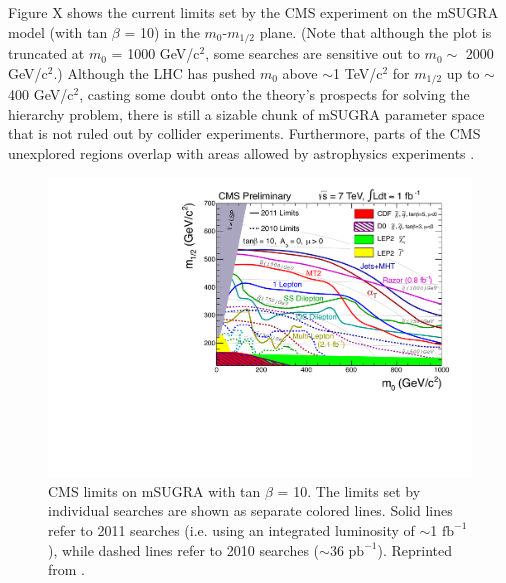 \documentclass[12pt, letterpaper]{report}
\begin{document}
Figure X shows the current limits set by the CMS experiment on the mSUGRA model (with tan $\beta$ = 10) in the $m_{0}$-$m_{1/2}$ plane.  (Note that although the plot is truncated at $m_{0}$ = 1000 GeV/$\mbox{c}^{2}$, some searches are sensitive out to $m_{0} \sim$ 2000 GeV/$\mbox{c}^{2}$.)  Although the LHC has pushed $m_{0}$ above $\sim$1 TeV/$\mbox{c}^{2}$ for $m_{1/2}$ up to $\sim$400 GeV/$\mbox{c}^{2}$, casting some doubt onto the theory's prospects for solving the hierarchy problem, there is still a sizable chunk of mSUGRA parameter space that is not ruled out by collider experiments.  Furthermore, parts of the CMS unexplored regions overlap with areas allowed by astrophysics experiments \cite{CMSSM_fits}.

\begin{figure}
	\centering
	\includegraphics[scale=0.6]{CMS_SUSY_2011Limits_tanb10}
	\caption{CMS limits on mSUGRA with tan $\beta$ = 10.  The limits set by individual searches are shown as separate colored lines.  Solid lines refer to 2011 searches (i.e. using an integrated luminosity of $\sim$1 $\mbox{fb}^{-1}$), while dashed lines refer to 2010 searches ($\sim$36 $\mbox{pb}^{-1}$).  Reprinted from \cite{CMS_mSUGRA}.}
\end{figure}

\end{document}
